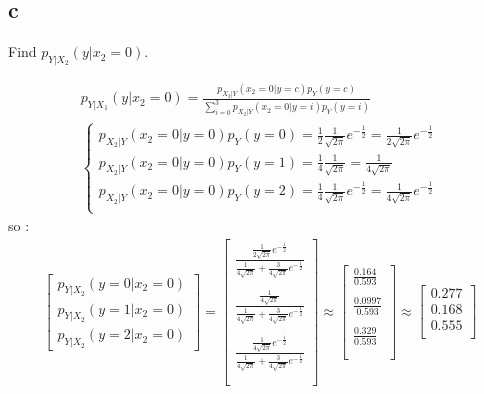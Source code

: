 \documentclass[12pt]{article}
\begin{document}
\subsection{c}
Find $p_{Y|X_2}(y|x_2 = 0)$.
\begin{qsolve}
    \begin{gather*}
        p_{Y|X_1}(y|x_2 = 0) = \frac{p_{X_2|Y}(x_2=0|y=c)p_{Y}(y=c)}{\sum_{i=0}^{3}p_{X_2|Y}(x_2=0|y=i)p_{Y}(y=i)}\\
        \begin{cases}
            p_{X_2|Y}(x_2=0|y=0)p_{Y}(y=0) = \frac{1}{2} \frac{1}{\sqrt{2\pi}} e^{-\frac{1}{2}} = \frac{1}{2\sqrt{2\pi}} e^{-\frac{1}{2}} \\
            p_{X_2|Y}(x_2=0|y=0)p_{Y}(y=1) = \frac{1}{4} \frac{1}{\sqrt{2\pi}} = \frac{1}{4\sqrt{2\pi}}                                   \\
            p_{X_2|Y}(x_2=0|y=0)p_{Y}(y=2) = \frac{1}{4} \frac{1}{\sqrt{2\pi}} e^{-\frac{1}{2}} = \frac{1}{4\sqrt{2\pi}} e^{-\frac{1}{2}} \\
        \end{cases}
    \end{gather*}
    so :
    \begin{gather*}
        \begin{bmatrix}
            p_{Y|X_2}(y = 0 |x_2 = 0) \\
            p_{Y|X_2}(y = 1 |x_2 = 0) \\
            p_{Y|X_2}(y = 2 |x_2 = 0)
        \end{bmatrix}
        = \begin{bmatrix}
            \frac{\frac{1}{2\sqrt{2\pi}} e^{-\frac{1}{2}}}{\frac{1}{4\sqrt{2\pi}} + \frac{3}{4\sqrt{2\pi}} e^{-\frac{1}{2}}} \\ \\
            \frac{\frac{1}{4\sqrt{2\pi}}}{\frac{1}{4\sqrt{2\pi}} + \frac{3}{4\sqrt{2\pi}} e^{-\frac{1}{2}}}                  \\ \\
            \frac{\frac{1}{4\sqrt{2\pi}} e^{-\frac{1}{2}}}{\frac{1}{4\sqrt{2\pi}} + \frac{3}{4\sqrt{2\pi}} e^{-\frac{1}{2}}} \\ \\
        \end{bmatrix}
        \approx \begin{bmatrix}
            \frac{0.164}{0.593}  \\ \\
            \frac{0.0997}{0.593} \\ \\
            \frac{0.329}{0.593}  \\ \\
        \end{bmatrix}
        \approx \begin{bmatrix}
            0.277 \\
            0.168 \\
            0.555 \\
        \end{bmatrix}
    \end{gather*}
\end{qsolve}
\end{document}
